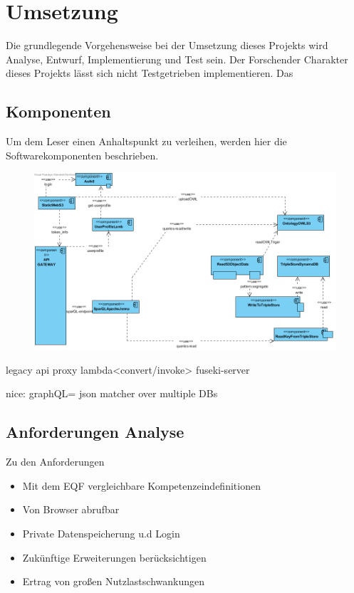 \documentclass[
12pt,
english,
ngerman,
headsepline,
twoside,
openright,
numbers=noenddot,version=first
]{scrreprt}
\begin{document}
\chapter{Umsetzung}
Die grundlegende Vorgehensweise bei der Umsetzung dieses Projekts wird Analyse, Entwurf, Implementierung und Test sein. Der Forschender Charakter dieses Projekts lässt sich nicht Testgetrieben implementieren.
Das



\section{Komponenten}

Um dem Leser einen Anhaltspunkt zu verleihen, werden hier die Softwarekomponenten beschrieben.

\begin{figure}[H]
\includegraphics[width=\linewidth]{pics/arch-comp.png}
\end{figure}

legacy api proxy\cite{sbarski2017serverless}
lambda<convert/invoke> fuseki-server\label{komponenten:fuseki}

nice: graphQL= json matcher over multiple DBs


\section{Anforderungen Analyse}

Zu den Anforderungen
\begin{itemize}
\item Mit dem EQF vergleichbare Kompetenzeindefinitionen
\item Von Browser abrufbar
\item Private Datenspeicherung u.d Login
\item Zukünftige Erweiterungen berücksichtigen
\item Ertrag von großen Nutzlastschwankungen
\end{itemize}
\end{document}
